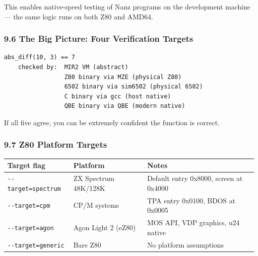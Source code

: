 \documentclass[
  11pt,
]{article}
\begin{document}
This enables native-speed testing of Nanz programs on the development
machine --- the same logic runs on both Z80 and AMD64.

\subsubsection{9.6 The Big Picture: Four Verification
Targets}\label{the-big-picture-four-verification-targets}

\begin{verbatim}
abs_diff(10, 3) == 7
    checked by:  MIR2 VM (abstract)
                 Z80 binary via MZE (physical Z80)
                 6502 binary via sim6502 (physical 6502)
                 C binary via gcc (host native)
                 QBE binary via QBE (modern native)
\end{verbatim}

If all five agree, you can be extremely confident the function is
correct.

\subsubsection{9.7 Z80 Platform Targets}\label{z80-platform-targets}

\begin{longtable}[]{@{}
  >{\raggedright\arraybackslash}p{}
  >{\raggedright\arraybackslash}p{}
  >{\raggedright\arraybackslash}p{}@{}}
\toprule\noalign{}
\begin{minipage}[b]{\linewidth}\raggedright
Target flag
\end{minipage} & \begin{minipage}[b]{\linewidth}\raggedright
Platform
\end{minipage} & \begin{minipage}[b]{\linewidth}\raggedright
Notes
\end{minipage} \\
\midrule\noalign{}
\endhead
\bottomrule\noalign{}
\endlastfoot
\texttt{-\/-target=spectrum} & ZX Spectrum 48K/128K & Default entry
0x8000, screen at 0x4000 \\
\texttt{-\/-target=cpm} & CP/M systems & TPA entry 0x0100, BDOS at
0x0005 \\
\texttt{-\/-target=agon} & Agon Light 2 (eZ80) & MOS API, VDP graphics,
u24 native \\
\texttt{-\/-target=generic} & Bare Z80 & No platform assumptions \\
\end{longtable}
\end{document}
